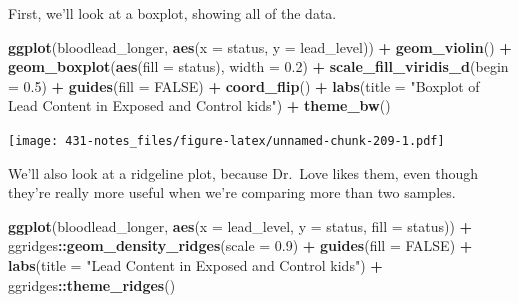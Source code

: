 \documentclass[
]{book}
\newenvironment{Shaded}{\begin{snugshade}}{\end{snugshade}}
\newcommand{\DataTypeTok}[1]{\textcolor[rgb]{0.13,0.29,0.53}{#1}}
\newcommand{\FloatTok}[1]{\textcolor[rgb]{0.00,0.00,0.81}{#1}}
\newcommand{\KeywordTok}[1]{\textcolor[rgb]{0.13,0.29,0.53}{\textbf{#1}}}
\newcommand{\NormalTok}[1]{#1}
\newcommand{\OperatorTok}[1]{\textcolor[rgb]{0.81,0.36,0.00}{\textbf{#1}}}
\newcommand{\OtherTok}[1]{\textcolor[rgb]{0.56,0.35,0.01}{#1}}
\newcommand{\StringTok}[1]{\textcolor[rgb]{0.31,0.60,0.02}{#1}}
\begin{document}
First, we'll look at a boxplot, showing all of the data.

\begin{Shaded}
\begin{Highlighting}[]
\KeywordTok{ggplot}\NormalTok{(bloodlead_longer, }\KeywordTok{aes}\NormalTok{(}\DataTypeTok{x =}\NormalTok{ status, }\DataTypeTok{y =}\NormalTok{ lead_level)) }\OperatorTok{+}
\StringTok{    }\KeywordTok{geom_violin}\NormalTok{() }\OperatorTok{+}
\StringTok{    }\KeywordTok{geom_boxplot}\NormalTok{(}\KeywordTok{aes}\NormalTok{(}\DataTypeTok{fill =}\NormalTok{ status), }\DataTypeTok{width =} \FloatTok{0.2}\NormalTok{) }\OperatorTok{+}
\StringTok{    }\KeywordTok{scale_fill_viridis_d}\NormalTok{(}\DataTypeTok{begin =} \FloatTok{0.5}\NormalTok{) }\OperatorTok{+}
\StringTok{    }\KeywordTok{guides}\NormalTok{(}\DataTypeTok{fill =} \OtherTok{FALSE}\NormalTok{) }\OperatorTok{+}\StringTok{ }
\StringTok{    }\KeywordTok{coord_flip}\NormalTok{() }\OperatorTok{+}
\StringTok{    }\KeywordTok{labs}\NormalTok{(}\DataTypeTok{title =} \StringTok{"Boxplot of Lead Content in Exposed and Control kids"}\NormalTok{) }\OperatorTok{+}\StringTok{ }
\StringTok{    }\KeywordTok{theme_bw}\NormalTok{()}
\end{Highlighting}
\end{Shaded}

\texttt{[image: 431-notes\_files/figure-latex/unnamed-chunk-209-1.pdf]}

We'll also look at a ridgeline plot, because Dr.~Love likes them, even though they're really more useful when we're comparing more than two samples.

\begin{Shaded}
\begin{Highlighting}[]
\KeywordTok{ggplot}\NormalTok{(bloodlead_longer, }\KeywordTok{aes}\NormalTok{(}\DataTypeTok{x =}\NormalTok{ lead_level, }\DataTypeTok{y =}\NormalTok{ status, }\DataTypeTok{fill =}\NormalTok{ status)) }\OperatorTok{+}
\StringTok{    }\NormalTok{ggridges}\OperatorTok{::}\KeywordTok{geom_density_ridges}\NormalTok{(}\DataTypeTok{scale =} \FloatTok{0.9}\NormalTok{) }\OperatorTok{+}
\StringTok{    }\KeywordTok{guides}\NormalTok{(}\DataTypeTok{fill =} \OtherTok{FALSE}\NormalTok{) }\OperatorTok{+}\StringTok{ }
\StringTok{    }\KeywordTok{labs}\NormalTok{(}\DataTypeTok{title =} \StringTok{"Lead Content in Exposed and Control kids"}\NormalTok{) }\OperatorTok{+}
\StringTok{    }\NormalTok{ggridges}\OperatorTok{::}\KeywordTok{theme_ridges}\NormalTok{()}
\end{Highlighting}
\end{Shaded}
\end{document}
